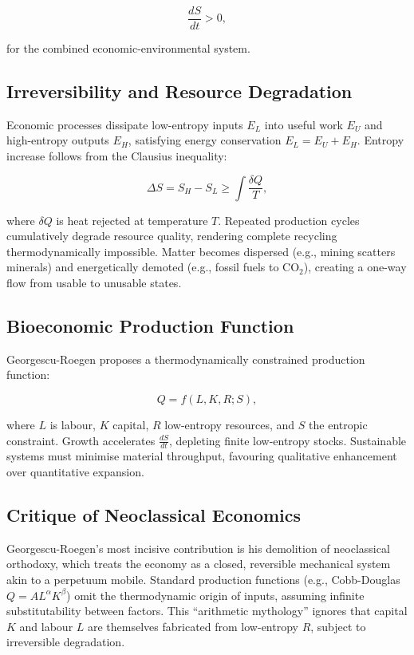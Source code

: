 \documentclass[12pt,a4paper]{article}
\begin{document}
\[
\frac{dS}{dt} > 0,
\]

for the combined economic-environmental system.

\subsection{Irreversibility and Resource Degradation}

Economic processes dissipate low-entropy inputs \(E_L\) into useful work \(E_U\) and high-entropy outputs \(E_H\), 
satisfying energy conservation \(E_L = E_U + E_H\). Entropy increase follows from the Clausius inequality:

\[
\Delta S = S_H - S_L \geq \int \frac{\delta Q}{T},
\]

where \(\delta Q\) is heat rejected at temperature \(T\). Repeated production cycles cumulatively degrade 
resource quality, rendering complete recycling thermodynamically impossible. 
Matter becomes dispersed (e.g., mining scatters minerals) and energetically demoted (e.g., fossil fuels to CO\(_2\)), 
creating a one-way flow from usable to unusable states.

\subsection{Bioeconomic Production Function}

Georgescu-Roegen proposes a thermodynamically constrained production function:

\[
Q = f(L, K, R; S),
\]

where \(L\) is labour, \(K\) capital, \(R\) low-entropy resources, and \(S\) the entropic constraint. 
Growth accelerates \(\frac{dS}{dt}\), depleting finite low-entropy stocks. 
Sustainable systems must minimise material throughput, 
favouring qualitative enhancement over quantitative expansion.

\subsection{Critique of Neoclassical Economics}

Georgescu-Roegen’s most incisive contribution is his demolition of neoclassical orthodoxy, 
which treats the economy as a closed, reversible mechanical system akin to a perpetuum mobile. 
Standard production functions (e.g., Cobb-Douglas \(Q = A L^\alpha K^\beta\)) 
omit the thermodynamic origin of inputs, assuming infinite substitutability between factors. 
This ``arithmetic mythology'' ignores that capital \(K\) and labour \(L\) are themselves 
fabricated from low-entropy \(R\), subject to irreversible degradation.
\end{document}

